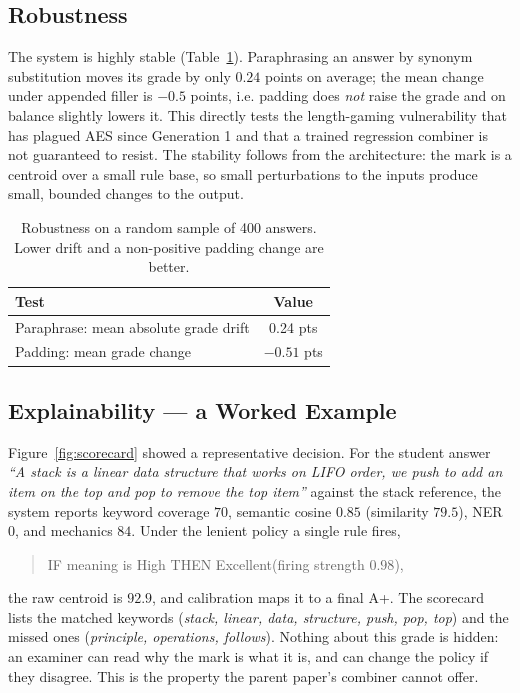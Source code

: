 \documentclass[11pt,a4paper]{article}
\newcommand{\rulebox}[1]{\colorbox{black!6}{\small\ttfamily #1}}
\begin{document}
\subsection{Robustness}

The system is highly stable (Table~\ref{tab:robust}). Paraphrasing an answer by
synonym substitution moves its grade by only $0.24$ points on average; the mean
change under appended filler is $-0.5$ points, i.e. padding does \emph{not} raise
the grade and on balance slightly lowers it. This directly tests the length-gaming
vulnerability that has plagued AES since Generation 1 \cite{ke2019} and that a
trained regression combiner is not guaranteed to resist. The stability follows
from the architecture: the mark is a centroid over a small rule base, so small
perturbations to the inputs produce small, bounded changes to the output.

\begin{table}[!ht]
\centering
\small
\caption{Robustness on a random sample of 400 answers. Lower drift and a
non-positive padding change are better.}
\label{tab:robust}
\begin{tabular}{@{}lc@{}}
\toprule
\textbf{Test} & \textbf{Value} \\
\midrule
Paraphrase: mean absolute grade drift  & 0.24 pts \\
Padding: mean grade change             & $-0.51$ pts \\
\bottomrule
\end{tabular}
\end{table}

\subsection{Explainability --- a Worked Example}

Figure~\ref{fig:scorecard} showed a representative decision. For the student
answer \emph{``A stack is a linear data structure that works on LIFO order, we
push to add an item on the top and pop to remove the top item''} against the stack
reference, the system reports keyword coverage $70$, semantic cosine $0.85$
(similarity $79.5$), NER $0$, and mechanics $84$. Under the lenient policy a single
rule fires,

\begin{quote}\footnotesize
\rulebox{IF meaning is High THEN Excellent}\quad(firing strength $0.98$),
\end{quote}

\noindent the raw centroid is $92.9$, and calibration maps it to a final A+. The scorecard lists the matched
keywords (\emph{stack, linear, data, structure, push, pop, top}) and the missed
ones (\emph{principle, operations, follows}). Nothing about this grade is hidden:
an examiner can read why the mark is what it is, and can change the policy if they
disagree. This is the property the parent paper's combiner cannot offer.
\end{document}
